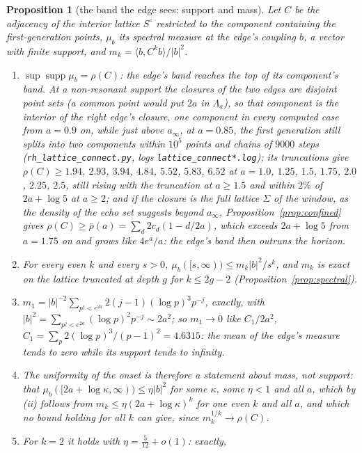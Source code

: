 \documentclass[11pt]{article}
\newtheorem{proposition}[theorem]{Proposition}
\theoremstyle{definition}
\theoremstyle{remark}
\begin{document}
\begin{proposition}[the band the edge sees: support and mass]\label{prop:edgeband}
Let $C$ be the adjacency of the interior lattice $S^\circ$ restricted to the component containing the first-generation points, $\mu_b$ its spectral measure at the edge's coupling $b$, a vector with finite support, and $m_k=\langle b,C^kb\rangle/|b|^2$.
\begin{enumerate}
\item[(i)] $\sup\operatorname{supp}\mu_b=\rho(C)$: the edge's band reaches the top of its component's band. At a non-resonant support the closures of the two edges are disjoint point sets (a common point would put $2a$ in $\Lambda_a$), so that component is the interior of the right edge's closure, one component in every computed case from $a=0.9$ on, while just above $a_\infty$, at $a=0.85$, the first generation still splits into two components within $10^5$ points and chains of $9000$ steps (\texttt{rh\_lattice\_connect.py}, logs \texttt{lattice\_connect*.log}); its truncations give $\rho(C)\ge1.94$, $2.93$, $3.94$, $4.84$, $5.52$, $5.83$, $6.52$ at $a=1.0$, $1.25$, $1.5$, $1.75$, $2.0$, $2.25$, $2.5$, still rising with the truncation at $a\ge1.5$ and within $2\%$ of $2a+\log5$ at $a\ge2$; and if the closure is the full lattice $\Sigma$ of the window, as the density of the echo set suggests beyond $a_\infty$, Proposition~\ref{prop:confined} gives $\rho(C)\ge\bar\rho(a)=\sum_d2c_d(1-d/2a)$, which exceeds $2a+\log5$ from $a=1.75$ on and grows like $4e^a/a$: the edge's band then outruns the horizon.
\item[(ii)] For every even $k$ and every $s>0$, $\mu_b([s,\infty))\le m_k|b|^2/s^k$, and $m_k$ is exact on the lattice truncated at depth $g$ for $k\le2g-2$ (Proposition~\ref{prop:spectral}).
\item[(iii)] $m_1=|b|^{-2}\sum_{p^j<e^{2a}}2(j-1)(\log p)^3p^{-j}$, exactly, with $|b|^2=\sum_{p^j<e^{2a}}(\log p)^2p^{-j}\sim2a^2$; so $m_1\to0$ like $C_1/2a^2$, $C_1=\sum_p2(\log p)^3/(p-1)^2=4.6315$: the mean of the edge's measure tends to zero while its support tends to infinity.
\item[(iv)] The uniformity of the onset is therefore a statement about mass, not support: that $\mu_b([2a+\log\kappa,\infty))\le\eta|b|^2$ for some $\kappa$, some $\eta<1$ and all $a$, which by (ii) follows from $m_k\le\eta(2a+\log\kappa)^k$ for one even $k$ and all $a$, and which no bound holding for all $k$ can give, since $m_k^{1/k}\to\rho(C)$.
\item[(v)] For $k=2$ it holds with $\eta=\tfrac5{12}+o(1)$: exactly,

\end{enumerate}
\end{proposition}
\end{document}
